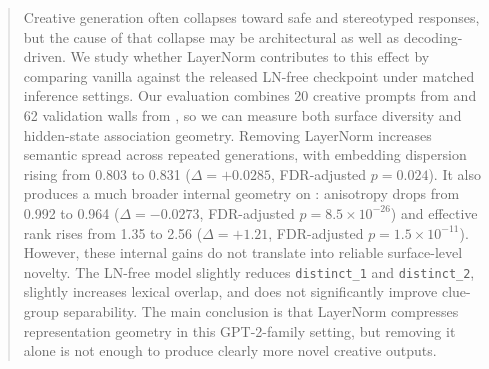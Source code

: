 \begin{abstract}
Creative generation often collapses toward safe and stereotyped responses, but the cause of that collapse may be architectural as well as decoding-driven. We study whether LayerNorm contributes to this effect by comparing vanilla \gpttwo against the released LN-free checkpoint \lnfreegpt under matched inference settings. Our evaluation combines 20 creative prompts from \noveltybench and 62 validation walls from \ocw, so we can measure both surface diversity and hidden-state association geometry. Removing LayerNorm increases semantic spread across repeated generations, with embedding dispersion rising from 0.803 to 0.831 ($\Delta=+0.0285$, FDR-adjusted $p=0.024$). It also produces a much broader internal geometry on \ocw: anisotropy drops from 0.992 to 0.964 ($\Delta=-0.0273$, FDR-adjusted $p=8.5\times 10^{-26}$) and effective rank rises from 1.35 to 2.56 ($\Delta=+1.21$, FDR-adjusted $p=1.5\times 10^{-11}$). However, these internal gains do not translate into reliable surface-level novelty. The LN-free model slightly reduces \texttt{distinct\_1} and \texttt{distinct\_2}, slightly increases lexical overlap, and does not significantly improve clue-group separability. The main conclusion is that LayerNorm compresses representation geometry in this GPT-2-family setting, but removing it alone is not enough to produce clearly more novel creative outputs.
\end{abstract}
